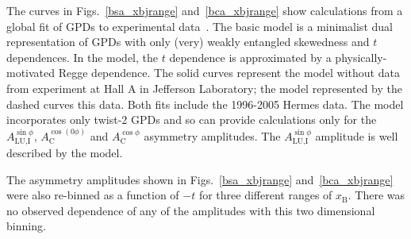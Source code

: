 The curves in Figs.~\ref{bsa_xbjrange} and~\ref{bca_xbjrange} show calculations from a global fit of GPDs to experimental data~\cite{Kum09}. The basic model is a minimalist dual representation of GPDs with only (very) weakly entangled skewedness and $t$ dependences. In the model, the $t$ dependence is approximated by a physically-motivated Regge dependence. The solid curves represent the model  without data from experiment \cite{Cam06, Gir08} at Hall A in Jefferson Laboratory; the model  represented by the dashed curves  this data. Both fits include the 1996-2005 H{\sc ermes} data. The model incorporates only twist-2 GPDs and so can provide calculations only for the $A_{\textrm{LU,I}}^{\sin\phi}$, $A_{\textrm{C}}^{\cos(0\phi)}$ and $A_{\textrm{C}}^{\cos\phi}$ asymmetry amplitudes. The $A_{\textrm{LU,I}}^{\sin\phi}$ amplitude is well described by the model. 

The asymmetry amplitudes shown in Figs.~\ref{bsa_xbjrange} and~\ref{bca_xbjrange} were also re-binned as a function of $-t$ for three different ranges of $x_{\textrm{B}}$. There was no observed dependence of any of the amplitudes with this two dimensional binning.
